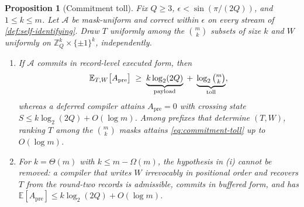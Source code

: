\documentclass[aps,prx,reprint,superscriptaddress,floatfix,longbibliography]{revtex4-2}
\newtheorem{proposition}{Proposition}
\begin{document}
\begin{proposition}[Commitment toll]
\label{prop:commitment-toll}
Fix $Q\geq3$, $\epsilon<\sin(\pi/(2Q))$, and $1\leq k\leq m$.  Let
$\mathcal A$ be mask-uniform and correct within $\epsilon$ on every stream
of \cref{def:self-identifying}.  Draw $T$ uniformly among the
$\binom{m}{k}$ subsets of size $k$ and $W$ uniformly on
$\mathbb Z_Q^k\times\{\pm1\}^k$, independently.
\begin{enumerate}[label=(\roman*),leftmargin=1.6em,topsep=2pt,itemsep=1pt]
\item If $\mathcal A$ commits in record-level executed form, then
\begin{equation}\label{eq:commitment-toll}
 \mathbb E_{T,W}\bigl[A_{\mathrm{pre}}\bigr]
 \;\geq\;\underbrace{k\log_2(2Q)}_{\text{payload}}
 \;+\;\underbrace{\log_2\tbinom{m}{k}}_{\text{toll}},
\end{equation}
whereas a deferred compiler attains $A_{\mathrm{pre}}=0$ with crossing
state $S\leq k\log_2(2Q)+O(\log m)$.  Among prefixes that determine
$(T,W)$, ranking $T$ among the $\binom mk$ masks attains
\cref{eq:commitment-toll} up to $O(\log m)$.
\item For $k=\Theta(m)$ with $k\leq m-\Omega(m)$, the hypothesis in (i)
cannot be removed: a compiler that writes $W$ irrevocably in positional
order and recovers $T$ from the round-two records is admissible, commits
in buffered form, and has
$\mathbb E[A_{\mathrm{pre}}]\leq k\log_2(2Q)+O(\log m)$.
\end{enumerate}
\end{proposition}
\end{document}
